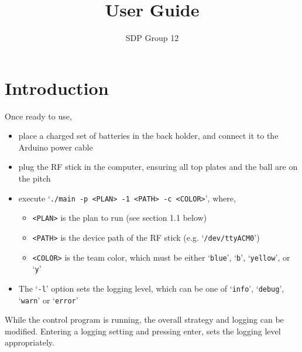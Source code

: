 ﻿\documentclass[12pt,a4paper]{article}
\author{SDP Group 12}
\title{User Guide}
\begin{document}
\maketitle




\section{Introduction}

Once ready to use, 

\begin{itemize}
    \item place a charged set of batteries in the back holder, and connect it to the Arduino power cable
    \item plug the RF stick in the computer, ensuring all top plates and the ball are on the pitch
    \item execute `\texttt{./main -p <PLAN> -1 <PATH> -c <COLOR>}', where,
    \begin{itemize}
	\item \texttt{<PLAN>} is the plan to run (see section 1.1 below)
	\item \texttt{<PATH>} is the device path of the RF stick (e.g. `\verb$/dev/ttyACM0$')
	\item \texttt{<COLOR>} is the team color, which must be either `\texttt{blue}', `\texttt{b}', `\texttt{yellow}', or `\texttt{y}'
    \end{itemize}
    \item The `\texttt{-l}' option sets the logging level, which can be one of `\texttt{info}', `\texttt{debug}', `\texttt{warn}' or `\texttt{error}'
\end{itemize}

While the control program is running, the overall strategy and logging can be modified. 
Entering a logging setting and pressing enter, sets the logging level appropriately.
\end{document}

